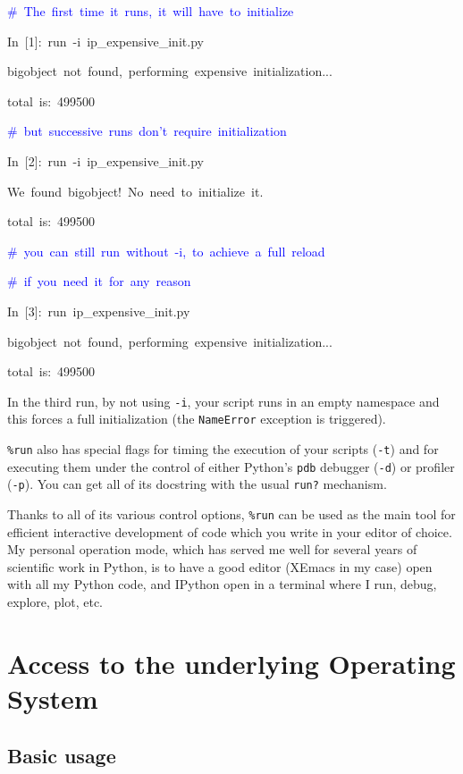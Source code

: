 \begin{lyxcode}
\textcolor{blue}{\#~The~first~time~it~runs,~it~will~have~to~initialize}

In~{[}1]:~run~-i~ip\_expensive\_init.py

bigobject~not~found,~performing~expensive~initialization...

total~is:~499500

\textcolor{blue}{\#~but~successive~runs~don't~require~initialization}

In~{[}2]:~run~-i~ip\_expensive\_init.py

We~found~bigobject!~No~need~to~initialize~it.

total~is:~499500

\textcolor{blue}{\#~you~can~still~run~without~-i,~to~achieve~a~full~reload~}

\textcolor{blue}{\#~if~you~need~it~for~any~reason}

In~{[}3]:~run~ip\_expensive\_init.py

bigobject~not~found,~performing~expensive~initialization...

total~is:~499500
\end{lyxcode}
In the third run, by not using \texttt{-i}, your script runs in an
empty namespace and this forces a full initialization (the \texttt{NameError}
exception is triggered).

\texttt{\%run} also has special flags for timing the execution of
your scripts (\texttt{-t}) and for executing them under the control
of either Python's \texttt{pdb} debugger (\texttt{-d}) or profiler
(\texttt{-p}). You can get all of its docstring with the usual \texttt{run?}
mechanism.

Thanks to all of its various control options, \texttt{\%run} can be
used as the main tool for efficient interactive development of code
which you write in your editor of choice. My personal operation mode,
which has served me well for several years of scientific work in Python,
is to have a good editor (XEmacs in my case) open with all my Python
code, and IPython open in a terminal where I run, debug, explore,
plot, etc.


\section[OS access]{Access to the underlying Operating System}


\subsection{Basic usage}

